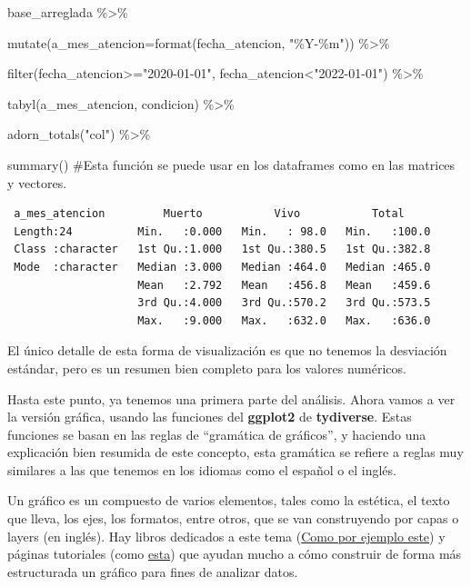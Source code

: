 \documentclass[
  letterpaper,
  DIV=11,
  numbers=noendperiod]{scrreprt}
\newenvironment{Shaded}{\begin{snugshade}}{\end{snugshade}}
\newcommand{\AttributeTok}[1]{\textcolor[rgb]{0.40,0.45,0.13}{#1}}
\newcommand{\CommentTok}[1]{\textcolor[rgb]{0.37,0.37,0.37}{#1}}
\newcommand{\FunctionTok}[1]{\textcolor[rgb]{0.28,0.35,0.67}{#1}}
\newcommand{\NormalTok}[1]{\textcolor[rgb]{0.00,0.23,0.31}{#1}}
\newcommand{\SpecialCharTok}[1]{\textcolor[rgb]{0.37,0.37,0.37}{#1}}
\newcommand{\StringTok}[1]{\textcolor[rgb]{0.13,0.47,0.30}{#1}}
\begin{document}
\begin{Shaded}
\begin{Highlighting}[]
\NormalTok{base\_arreglada }\SpecialCharTok{\%\textgreater{}\%}
  
  \FunctionTok{mutate}\NormalTok{(}\AttributeTok{a\_mes\_atencion=}\FunctionTok{format}\NormalTok{(fecha\_atencion, }\StringTok{"\%Y{-}\%m"}\NormalTok{)) }\SpecialCharTok{\%\textgreater{}\%} 
 
   \FunctionTok{filter}\NormalTok{(fecha\_atencion}\SpecialCharTok{\textgreater{}=}\StringTok{"2020{-}01{-}01"}\NormalTok{, fecha\_atencion}\SpecialCharTok{\textless{}}\StringTok{"2022{-}01{-}01"}\NormalTok{) }\SpecialCharTok{\%\textgreater{}\%} 
  
  \FunctionTok{tabyl}\NormalTok{(a\_mes\_atencion, condicion) }\SpecialCharTok{\%\textgreater{}\%} 
  
  \FunctionTok{adorn\_totals}\NormalTok{(}\StringTok{"col"}\NormalTok{) }\SpecialCharTok{\%\textgreater{}\%} 
  
  \FunctionTok{summary}\NormalTok{() }\CommentTok{\#Esta función se puede usar en los dataframes como en las matrices y vectores.}
\end{Highlighting}
\end{Shaded}

\begin{verbatim}
 a_mes_atencion         Muerto           Vivo           Total      
 Length:24          Min.   :0.000   Min.   : 98.0   Min.   :100.0  
 Class :character   1st Qu.:1.000   1st Qu.:380.5   1st Qu.:382.8  
 Mode  :character   Median :3.000   Median :464.0   Median :465.0  
                    Mean   :2.792   Mean   :456.8   Mean   :459.6  
                    3rd Qu.:4.000   3rd Qu.:570.2   3rd Qu.:573.5  
                    Max.   :9.000   Max.   :632.0   Max.   :636.0  
\end{verbatim}

El único detalle de esta forma de visualización es que no tenemos la
desviación estándar, pero es un resumen bien completo para los valores
numéricos.

Hasta este punto, ya tenemos una primera parte del análisis. Ahora vamos
a ver la versión gráfica, usando las funciones del \textbf{ggplot2} de
\textbf{tydiverse}. Estas funciones se basan en las reglas de
``gramática de gráficos'', y haciendo una explicación bien resumida de
este concepto, esta gramática se refiere a reglas muy similares a las
que tenemos en los idiomas como el español o el inglés.

Un gráfico es un compuesto de varios elementos, tales como la estética,
el texto que lleva, los ejes, los formatos, entre otros, que se van
construyendo por capas o layers (en inglés). Hay libros dedicados a este
tema (\href{https://ggplot2-book.org/}{Como por ejemplo este}) y páginas
tutoriales (como \href{https://r-graph-gallery.com/}{esta}) que ayudan
mucho a cómo construir de forma más estructurada un gráfico para fines
de analizar datos.
\end{document}
